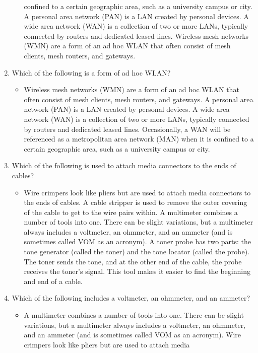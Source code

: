 \documentclass{article}
\begin{document}
\begin{enumerate}
\begin{itemize}
confined to a certain geographic area, such as a university campus or city. A personal area
network (PAN) is a LAN created by personal devices. A wide area network (WAN) is a
collection of two or more LANs, typically connected by routers and dedicated leased lines.
Wireless mesh networks (WMN) are a form of an ad hoc WLAN that often consist of mesh
clients, mesh routers, and gateways.
    \end{itemize}
    \item Which of the following is a form of ad hoc WLAN?
     \begin{itemize}
        \item Wireless mesh networks (WMN) are a form of an ad hoc WLAN that often consist
of mesh clients, mesh routers, and gateways. A personal area network (PAN) is a LAN
created by personal devices. A wide area network (WAN) is a collection of two or more
LANs, typically connected by routers and dedicated leased lines. Occasionally, a WAN
will be referenced as a metropolitan area network (MAN) when it is confined to a certain
geographic area, such as a university campus or city.
    \end{itemize}
    \item Which of the following is used to attach media connectors to the ends of cables?
     \begin{itemize}
        \item Wire crimpers look like pliers but are used to attach media connectors to the ends
of cables. A cable stripper is used to remove the outer covering of the cable to get to the
wire pairs within. A multimeter combines a number of tools into one. There can be slight
variations, but a multimeter always includes a voltmeter, an ohmmeter, and an ammeter
(and is sometimes called VOM as an acronym). A toner probe has two parts: the tone
generator (called the toner) and the tone locator (called the probe). The toner sends the
tone, and at the other end of the cable, the probe receives the toner’s signal. This tool makes
it easier to find the beginning and end of a cable.
    \end{itemize}
    \item Which of the following includes a voltmeter, an ohmmeter, and an ammeter?
    \begin{itemize}
        \item A multimeter combines a number of tools into one. There can be slight variations, but a
multimeter always includes a voltmeter, an ohmmeter, and an ammeter (and is sometimes
called VOM as an acronym). Wire crimpers look like pliers but are used to attach media

\end{itemize}
\end{enumerate}
\end{document}
